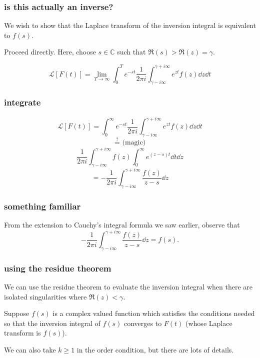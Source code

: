 \documentclass[mathserif]{beamer}
\begin{document}
\begin{frame}
  \frametitle{is this actually an inverse?}

  We wish to show that the Laplace transform of the inversion integral is equivalent to $f(s)$.

  \pause Proceed directly. Here, choose $s\in\mathbb{C}$ such that $\Re(s)>\Re(z) = \gamma$.

  \[\mathcal{L}[F(t)] = \lim_{T\to \infty}\int_0^Te^{-st}\frac{1}{2\pi i}\int_{\gamma-i\infty}^{\gamma+i\infty}e^{zt}f(z)\dd{z}\dd{t}\]

\end{frame}

\begin{frame}
  \frametitle{integrate}

  \[\mathcal{L}[F(t)] = \int_0^\infty e^{-st}\frac{1}{2\pi i}\int_{\gamma-i\infty}^{\gamma+i\infty}e^{zt}f(z)\dd{z}\dd{t}\]
  \pause \[\stackrel{?}{=}\text{ (magic)}\]
  \[ \frac{1}{2\pi i}\int_{\gamma-i\infty}^{\gamma+i\infty}f(z)\int_0^\infty e^{(z-s)t}\dd{t}\dd{z}\]
  \pause \[ = -\frac{1}{2\pi i}\int_{\gamma-i\infty}^{\gamma+i\infty} \frac{f(z)}{z-s}\dd{z}\]

\end{frame}

\begin{frame}
  \frametitle{something familiar}

  From the extension to Cauchy's integral formula we saw earlier, observe that \[-\frac{1}{2\pi i}\int_{\gamma-i\infty}^{\gamma+i\infty} \frac{f(z)}{z-s}\dd{z} = f(s).\]

\end{frame}

\begin{frame}
  \frametitle{using the residue theorem}

  We can use the residue theorem to evaluate the inversion integral when there are isolated singularities where $\Re(z) < \gamma$.

  \pause Suppose $f(s)$ is a complex valued function which satisfies the conditions needed so that the inversion integral of $f(s)$ converges to $F(t)$ (whose Laplace transform is $f(s)$).

  \pause We can also take $k\geq 1$ in the order condition, but there are lots of details.

\end{frame}
\end{document}

